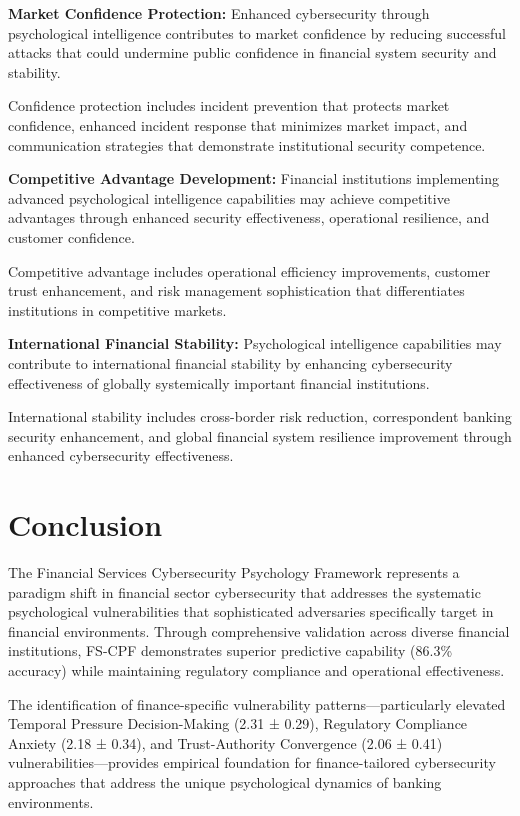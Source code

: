 \documentclass[10pt, twocolumn]{article}
\begin{document}
\textbf{Market Confidence Protection:} Enhanced cybersecurity through psychological intelligence contributes to market confidence by reducing successful attacks that could undermine public confidence in financial system security and stability.

Confidence protection includes incident prevention that protects market confidence, enhanced incident response that minimizes market impact, and communication strategies that demonstrate institutional security competence.

\textbf{Competitive Advantage Development:} Financial institutions implementing advanced psychological intelligence capabilities may achieve competitive advantages through enhanced security effectiveness, operational resilience, and customer confidence.

Competitive advantage includes operational efficiency improvements, customer trust enhancement, and risk management sophistication that differentiates institutions in competitive markets.

\textbf{International Financial Stability:} Psychological intelligence capabilities may contribute to international financial stability by enhancing cybersecurity effectiveness of globally systemically important financial institutions.

International stability includes cross-border risk reduction, correspondent banking security enhancement, and global financial system resilience improvement through enhanced cybersecurity effectiveness.

\section{Conclusion}

The Financial Services Cybersecurity Psychology Framework represents a paradigm shift in financial sector cybersecurity that addresses the systematic psychological vulnerabilities that sophisticated adversaries specifically target in financial environments. Through comprehensive validation across diverse financial institutions, FS-CPF demonstrates superior predictive capability (86.3\% accuracy) while maintaining regulatory compliance and operational effectiveness.

The identification of finance-specific vulnerability patterns—particularly elevated Temporal Pressure Decision-Making (2.31 ± 0.29), Regulatory Compliance Anxiety (2.18 ± 0.34), and Trust-Authority Convergence (2.06 ± 0.41) vulnerabilities—provides empirical foundation for finance-tailored cybersecurity approaches that address the unique psychological dynamics of banking environments.
\end{document}
